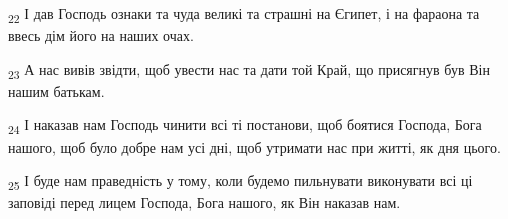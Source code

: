 \begin{tcolorbox}
\textsubscript{22} І дав Господь ознаки та чуда великі та страшні на Єгипет, і на фараона та ввесь дім його на наших очах.
\end{tcolorbox}
\begin{tcolorbox}
\textsubscript{23} А нас вивів звідти, щоб увести нас та дати той Край, що присягнув був Він нашим батькам.
\end{tcolorbox}
\begin{tcolorbox}
\textsubscript{24} І наказав нам Господь чинити всі ті постанови, щоб боятися Господа, Бога нашого, щоб було добре нам усі дні, щоб утримати нас при житті, як дня цього.
\end{tcolorbox}
\begin{tcolorbox}
\textsubscript{25} І буде нам праведність у тому, коли будемо пильнувати виконувати всі ці заповіді перед лицем Господа, Бога нашого, як Він наказав нам.
\end{tcolorbox}
